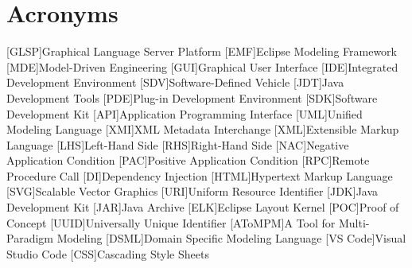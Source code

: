 \newpage
\section{Acronyms}
\label{sec:acronyms}
\begin{acronym}[AToMPM]
    [GLSP]{Graphical Language Server Platform}
    [EMF]{Eclipse Modeling Framework}
    [MDE]{Model-Driven Engineering}
    [GUI]{Graphical User Interface}
    [IDE]{Integrated Development Environment}
    [SDV]{Software-Defined Vehicle}
    [JDT]{Java Development Tools}
    [PDE]{Plug-in Development Environment}
    [SDK]{Software Development Kit}
    [API]{Application Programming Interface}
    [UML]{Unified Modeling Language}
    [XMI]{XML Metadata Interchange}
    [XML]{Extensible Markup Language}
    [LHS]{Left-Hand Side}
    [RHS]{Right-Hand Side}
    [NAC]{Negative Application Condition}
    [PAC]{Positive Application Condition}
    [RPC]{Remote Procedure Call}
    [DI]{Dependency Injection}
    [HTML]{Hypertext Markup Language}
    [SVG]{Scalable Vector Graphics}
    [URI]{Uniform Resource Identifier}
    [JDK]{Java Development Kit}
    [JAR]{Java Archive}
    [ELK]{Eclipse Layout Kernel}
    [POC]{Proof of Concept}
    [UUID]{Universally Unique Identifier}
    [AToMPM]{A Tool for Multi-Paradigm Modeling}
    [DSML]{Domain Specific Modeling Language}
    [VS Code]{Visual Studio Code}
    [CSS]{Cascading Style Sheets}
  \end{acronym}